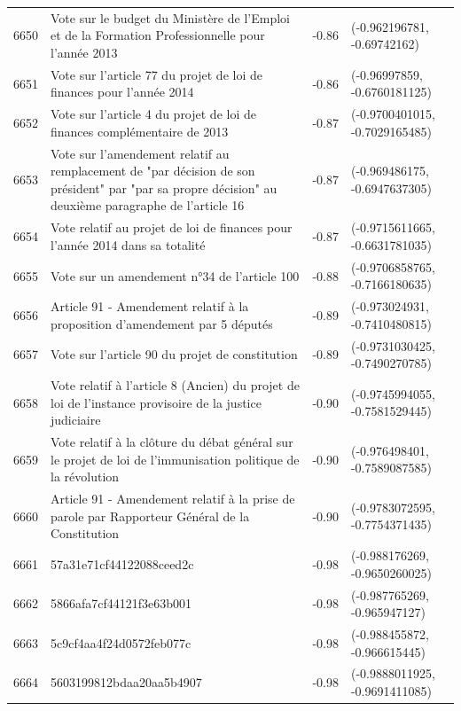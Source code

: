 \begin{table}[ht]
\begin{tabular}{rlrl}
  6650 & Vote sur le budget du Ministère de l'Emploi et de la Formation Professionnelle pour l'année 2013 & -0.86 & (-0.962196781, -0.69742162) \\ 
  6651 & Vote sur l'article 77 du projet de loi de finances pour l'année 2014 & -0.86 & (-0.96997859, -0.6760181125) \\ 
  6652 & Vote sur l'article 4 du projet de loi de finances complémentaire de 2013 & -0.87 & (-0.9700401015, -0.7029165485) \\ 
  6653 & Vote sur l'amendement relatif au remplacement de "par décision de son président" par "par sa propre décision" au deuxième paragraphe de l'article 16 & -0.87 & (-0.969486175, -0.6947637305) \\ 
  6654 & Vote relatif au projet de loi de finances pour l'année 2014 dans sa totalité & -0.87 & (-0.9715611665, -0.6631781035) \\ 
  6655 & Vote sur un amendement n°34 de l'article 100 & -0.88 & (-0.9706858765, -0.7166180635) \\ 
  6656 & Article 91 - Amendement relatif à la proposition d'amendement par 5 députés & -0.89 & (-0.973024931, -0.7410480815) \\ 
  6657 & Vote sur l'article 90 du projet de constitution & -0.89 & (-0.9731030425, -0.7490270785) \\ 
  6658 & Vote relatif à l'article 8 (Ancien) du projet de loi de l'instance provisoire de la justice judiciaire & -0.90 & (-0.9745994055, -0.7581529445) \\ 
  6659 & Vote relatif à la clôture du débat général sur le projet de loi de l'immunisation politique de la révolution & -0.90 & (-0.976498401, -0.7589087585) \\ 
  6660 & Article 91 - Amendement relatif à la prise de parole par Rapporteur Général de la Constitution & -0.90 & (-0.9783072595, -0.7754371435) \\ 
  6661 & 57a31e71cf44122088ceed2c & -0.98 & (-0.988176269, -0.9650260025) \\ 
  6662 & 5866afa7cf44121f3e63b001 & -0.98 & (-0.987765269, -0.965947127) \\ 
  6663 & 5c9cf4aa4f24d0572feb077c & -0.98 & (-0.988455872, -0.966615445) \\ 
  6664 & 5603199812bdaa20aa5b4907 & -0.98 & (-0.9888011925, -0.9691411085) \\ 
   \hline
\end{tabular}
\end{table}
